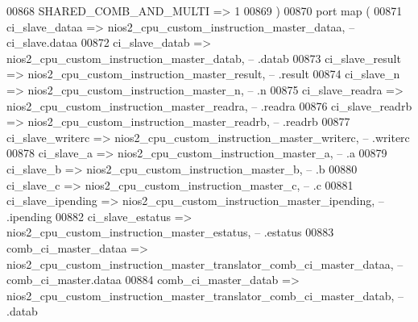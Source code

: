 \begin{DoxyCode}
00868             SHARED\_COMB\_AND\_MULTI => \textcolor{vhdllogic}{1}
00869         \textcolor{vhdlchar}{)}
00870         \textcolor{keywordflow}{port} \textcolor{keywordflow}{map} (
00871             ci\_slave\_dataa            => 
      nios2_cpu_custom_instruction_master_dataa,\textcolor{keyword}{                              --       ci\_slave.dataa}
00872             ci\_slave\_datab            => 
      nios2_cpu_custom_instruction_master_datab,\textcolor{keyword}{                              --               .datab}
00873             ci\_slave\_result           => 
      nios2_cpu_custom_instruction_master_result,\textcolor{keyword}{                             --               .result}
00874             ci\_slave\_n                => nios2_cpu_custom_instruction_master_n,\textcolor{keyword}{                            
            --               .n}
00875             ci\_slave\_readra           => 
      nios2_cpu_custom_instruction_master_readra,\textcolor{keyword}{                             --               .readra}
00876             ci\_slave\_readrb           => 
      nios2_cpu_custom_instruction_master_readrb,\textcolor{keyword}{                             --               .readrb}
00877             ci\_slave\_writerc          => 
      nios2_cpu_custom_instruction_master_writerc,\textcolor{keyword}{                            --               .writerc}
00878             ci\_slave\_a                => nios2_cpu_custom_instruction_master_a,\textcolor{keyword}{                            
            --               .a}
00879             ci\_slave\_b                => nios2_cpu_custom_instruction_master_b,\textcolor{keyword}{                            
            --               .b}
00880             ci\_slave\_c                => nios2_cpu_custom_instruction_master_c,\textcolor{keyword}{                            
            --               .c}
00881             ci\_slave\_ipending         => 
      nios2_cpu_custom_instruction_master_ipending,\textcolor{keyword}{                           --               .ipending}
00882             ci\_slave\_estatus          => 
      nios2_cpu_custom_instruction_master_estatus,\textcolor{keyword}{                            --               .estatus}
00883             comb\_ci\_master\_dataa      => 
      nios2_cpu_custom_instruction_master_translator_comb_ci_master_dataa,\textcolor{keyword}{    -- comb\_ci\_master.dataa}
00884             comb\_ci\_master\_datab      => 
      nios2_cpu_custom_instruction_master_translator_comb_ci_master_datab,\textcolor{keyword}{    --               .datab}

\end{DoxyCode}
